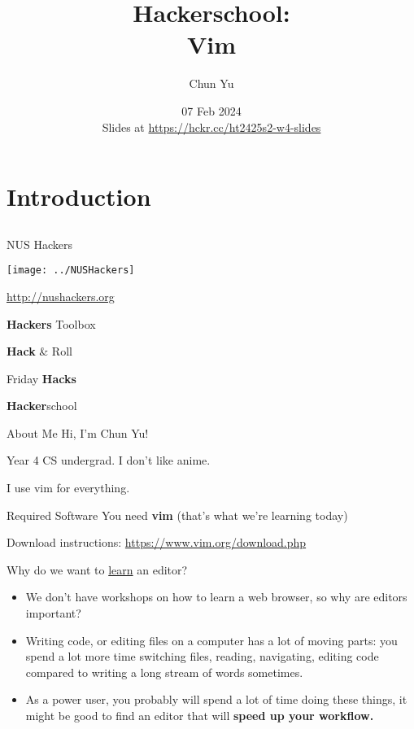 \documentclass[12pt]{beamer}
\title{Hackerschool: \\Vim}
\author{Chun Yu}
\date{07 Feb 2024 \\ Slides at \url{https://hckr.cc/ht2425s2-w4-slides}}
\begin{document}
\frame[plain]{\titlepage}

\section{Introduction}
\subsection{}

\begin{frame}{NUS Hackers}

    \begin{center}
        \texttt{[image: ../NUSHackers]}

        \url{http://nushackers.org}
    \end{center}

    \begin{center}
        \textbf{Hackers} Toolbox

        \textbf{Hack} \& Roll

        Friday \textbf{Hacks}

        \textbf{Hacker}school
    \end{center}

\end{frame}

\begin{frame}{About Me}
    Hi, I'm Chun Yu!

    Year 4 CS undergrad. I don't like anime.

    I use vim for everything.
\end{frame}

\begin{frame}{Required Software}
    You need \textbf{vim} (that's what we're learning today)

    Download instructions: \url{https://www.vim.org/download.php}
\end{frame}

\begin{frame}{Why do we want to \underline{learn} an editor?}
    \begin{itemize}
        \item We don't have workshops on how to learn a web browser, so why are editors important?
        \item Writing code, or editing files on a computer has a lot of moving parts: you spend a lot more time switching files, reading, navigating, editing code compared to writing a long stream of words sometimes.
        \item As a power user, you probably will spend a lot of time doing these things, it might be good to find an editor that will \textbf{speed up your workflow.}
    \end{itemize}
\end{frame}
\end{document}
